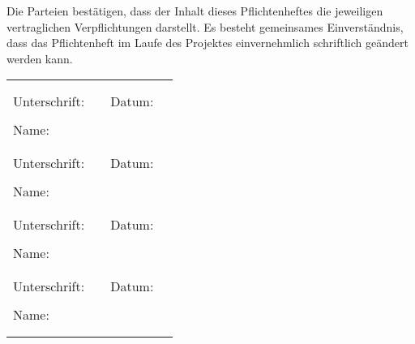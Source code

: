 \documentclass[
11pt,
a4paper,
ngerman,
]{article}
\begin{document}
Die Parteien bestätigen, dass der Inhalt dieses Pflichtenheftes die jeweiligen vertraglichen Verpflichtungen darstellt. Es besteht gemeinsames Einverständnis, dass das Pflichtenheft im Laufe des Projektes einvernehmlich schriftlich geändert werden kann.

\begin{table}[H]
	\begin{tabularx}{\textwidth}{ |m{2cm}Xm{1.2cm}X| }
		\hline
		\multicolumn{4}{|c|}{} \\
		\multicolumn{4}{|c|}{} \\
		Unterschrift: & \makebox[0.3\columnwidth]{\dotfill} & Datum: & \makebox[0.3\columnwidth]{\dotfill} \\
		\multicolumn{4}{|c|}{} \\
		Name: & \makebox[0.3\columnwidth]{\dotfill} & \multicolumn{2}{c|}{} \\
		\multicolumn{4}{|c|}{} \\
		\multicolumn{4}{|c|}{} \\
		Unterschrift: & \makebox[0.3\columnwidth]{\dotfill} & Datum: & \makebox[0.3\columnwidth]{\dotfill} \\
		\multicolumn{4}{|c|}{} \\
		Name: & \makebox[0.3\columnwidth]{\dotfill} & \multicolumn{2}{c|}{} \\
		\multicolumn{4}{|c|}{} \\
		\multicolumn{4}{|c|}{} \\
		Unterschrift: & \makebox[0.3\columnwidth]{\dotfill} & Datum: & \makebox[0.3\columnwidth]{\dotfill} \\
		\multicolumn{4}{|c|}{} \\
		Name: & \makebox[0.3\columnwidth]{\dotfill} & \multicolumn{2}{c|}{} \\
		\multicolumn{4}{|c|}{} \\
		\multicolumn{4}{|c|}{} \\
		Unterschrift: & \makebox[0.3\columnwidth]{\dotfill} & Datum: & \makebox[0.3\columnwidth]{\dotfill} \\
		\multicolumn{4}{|c|}{} \\
		Name: & \makebox[0.3\columnwidth]{\dotfill} & \multicolumn{2}{c|}{} \\
		\multicolumn{4}{|c|}{} \\
		\multicolumn{4}{|c|}{} \\
		\hline
	\end{tabularx}
\end{table}
\end{document}
